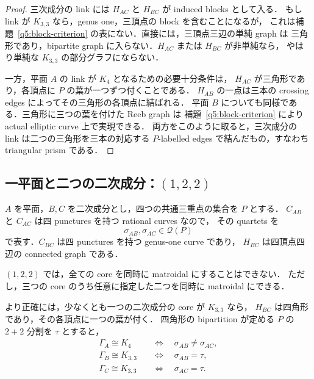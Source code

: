 \begin{proof}
三次成分の link には $H_{AC}$ と $H_{BC}$ が induced blocks として入る．
もし link が $K_{3,3}$ なら，genus one，三頂点の block を含むことになるが，
これは補題~\ref{q5:block-criterion} の表にない．直接には，三頂点三辺の単純 graph は
三角形であり，bipartite graph に入らない．$H_{AC}$ または $H_{BC}$ が非単純なら，
やはり単純な $K_{3,3}$ の部分グラフにならない．

一方，平面 $A$ の link が $K_4$ となるための必要十分条件は，
$H_{AC}$ が三角形であり，各頂点に $P$ の葉が一つずつ付くことである．
$H_{AB}$ の一点は三本の crossing edges によってその三角形の各頂点に結ばれる．
平面 $B$ についても同様である．三角形に三つの葉を付けた Reeb graph は
補題~\ref{q5:block-criterion} により actual elliptic curve 上で実現できる．
両方をこのように取ると，三次成分の link は二つの三角形を三本の対応する
$P$-labelled edges で結んだもの，すなわち triangular prism である．
\end{proof}

\subsection{一平面と二つの二次成分：\texorpdfstring{$(1,2,2)$}{(1,2,2)}}

$A$ を平面，$B,C$ を二次成分とし，四つの共通三重点の集合を $P$ とする．
$C_{AB}$ と $C_{AC}$ は四 punctures を持つ rational curves なので，
その quartets を
\[
 \sigma_{AB},\sigma_{AC}\in\mathcal Q(P)
\]
で表す．$C_{BC}$ は四 punctures を持つ genus-one curve であり，
$H_{BC}$ は四頂点四辺の connected graph である．

\begin{proposition}\label{q5:122}
$(1,2,2)$ では，全ての core を同時に matroidal にすることはできない．
ただし，三つの core のうち任意に指定した二つを同時に matroidal にできる．

より正確には，少なくとも一つの二次成分の core が $K_{3,3}$ なら，
$H_{BC}$ は四角形であり，その各頂点に一つの葉が付く．
四角形の bipartition が定める $P$ の $2+2$ 分割を $\tau$ とすると，
\begin{align}
 \Gamma_A\cong K_4&\quad\Longleftrightarrow\quad
      \sigma_{AB}\ne\sigma_{AC},\label{q5:122-plane}\\
 \Gamma_B\cong K_{3,3}&\quad\Longleftrightarrow\quad
      \sigma_{AB}=\tau,\label{q5:122-B}\\
 \Gamma_C\cong K_{3,3}&\quad\Longleftrightarrow\quad
      \sigma_{AC}=\tau.\label{q5:122-C}
\end{align}
\end{proposition}

